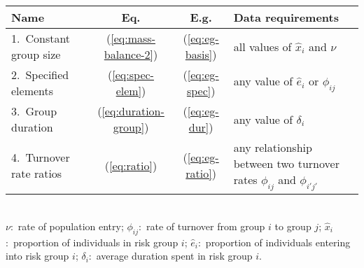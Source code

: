 \begin{tabular}{lccl}
	\toprule
	Name                    &            Eq.            &        E.g.         & Data requirements                                                         \\
	\midrule
	1.~Constant group size  & (\ref{eq:mass-balance-2}) & (\ref{eq:eg-basis}) & all values of $\hat{x}_i$ and $\nu$                                       \\
	2.~Specified elements   &   (\ref{eq:spec-elem})    & (\ref{eq:eg-spec})  & any value of $\hat{e}_i$ or $\phi_{ij}$                                   \\
	3.~Group duration       & (\ref{eq:duration-group}) &  (\ref{eq:eg-dur})  & any value of $\delta_i$                                                   \\
	4.~Turnover rate ratios &     (\ref{eq:ratio})      & (\ref{eq:eg-ratio}) & any relationship between two turnover rates $\phi_{ij}$ and $\phi_{i'j'}$ \\
	\bottomrule
\end{tabular}\\[1em]
\footnotesize\flushleft
$\nu$:~rate of population entry;
$\phi_{ij}$:~rate of turnover from group $i$ to group $j$;
$\hat{x}_i$:~proportion of individuals in risk group $i$;
$\hat{e}_i$:~proportion of individuals entering into risk group $i$;
$\delta_i$:~average duration spent in risk group $i$.